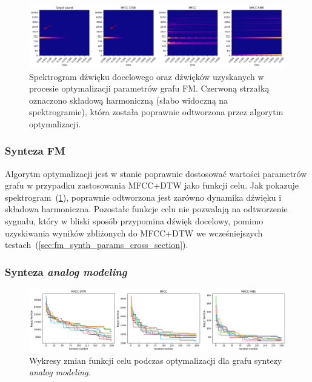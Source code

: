 \begin{figure}[H]
    \centering
    \includegraphics[width=1.0\linewidth]{rys03/spectro_results_fm.png}
    \caption{
      Spektrogram dźwięku docelowego oraz dźwięków uzyskanych w procesie optymalizacji parametrów grafu FM\@.
      Czerwoną strzałką oznaczono składową harmoniczną (słabo widoczną na spektrogramie),
      która została poprawnie odtworzona przez algorytm optymalizacji.
    }\label{fig:param_optimisation_results_spectrograms}
\end{figure}

\subsubsection{Synteza FM}

Algorytm optymalizacji jest w stanie poprawnie dostosować wartości parametrów grafu w przypadku
zastosowania MFCC+DTW jako funkcji celu. Jak pokazuje spektrogram~(\ref{fig:param_optimisation_results_spectrograms}),
poprawnie odtworzona jest zarówno dynamika dźwięku i składowa harmoniczna. Pozostałe funkcje celu nie pozwalają
na odtworzenie sygnału, który w bliski sposób przypomina dźwięk docelowy, pomimo uzyskiwania wyników zbliżonych
do MFCC+DTW we wcześniejszych testach~(\ref{sec:fm_synth_params_cross_section}).

\subsubsection{Synteza \textit{analog modeling}}

\begin{figure}[H]
    \centering
    \includegraphics[width=1.0\linewidth]{rys03/am_training_results.png}
    \caption{
      Wykresy zmian funkcji celu podczas optymalizacji dla grafu syntezy \textit{analog modeling}.
    }\label{fig:am_target_fun_plots}
\end{figure}


